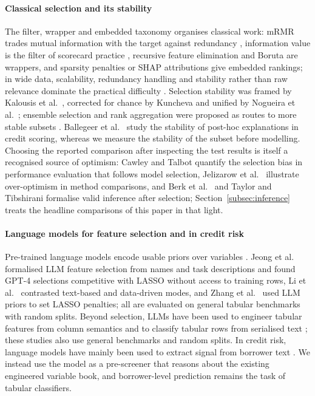 \documentclass[final,5p,twocolumn]{elsarticle}
\begin{document}
\paragraph{Classical selection and its stability}
The filter, wrapper and embedded taxonomy \cite{kohavi1997,guyon2003} organises classical work: mRMR trades mutual information with the target against redundancy \cite{peng2005}, information value is the filter of scorecard practice \cite{siddiqi2006}, recursive feature elimination \cite{guyon2002} and Boruta \cite{kursa2010,breiman2001} are wrappers, and sparsity penalties \cite{tibshirani1996} or SHAP attributions \cite{lundberg2017} give embedded rankings; in wide data, scalability, redundancy handling and stability rather than raw relevance dominate the practical difficulty \cite{boloncanedo2015}. Selection stability was framed by Kalousis et al.\ \cite{kalousis2007}, corrected for chance by Kuncheva \cite{kuncheva2007} and unified by Nogueira et al.\ \cite{nogueira2018}; ensemble selection and rank aggregation were proposed as routes to more stable subsets \cite{saeys2008,dwork2001}. Ballegeer et al.\ \cite{ballegeer2025} study the stability of post-hoc explanations in credit scoring, whereas we measure the stability of the subset before modelling. Choosing the reported comparison after inspecting the test results is itself a recognised source of optimism: Cawley and Talbot \cite{cawley2010} quantify the selection bias in performance evaluation that follows model selection, Jelizarow et al.\ \cite{jelizarow2010} illustrate over-optimism in method comparisons, and Berk et al.\ \cite{berk2013} and Taylor and Tibshirani \cite{taylor2015} formalise valid inference after selection; Section~\ref{subsec:inference} treats the headline comparisons of this paper in that light.

\paragraph{Language models for feature selection and in credit risk}
Pre-trained language models encode usable priors over variables \cite{choi2022}. Jeong et al.\ \cite{jeong2025} formalised LLM feature selection from names and task descriptions and found GPT-4 selections competitive with LASSO without access to training rows, Li et al.\ \cite{li2025sigkdd} contrasted text-based and data-driven modes, and Zhang et al.\ \cite{zhang2025llmlasso} used LLM priors to set LASSO penalties; all are evaluated on general tabular benchmarks with random splits. Beyond selection, LLMs have been used to engineer tabular features from column semantics \cite{hollmann2023caafe,han2024llmfe,nam2024octree} and to classify tabular rows from serialised text \cite{hegselmann2023tabllm}; these studies also use general benchmarks and random splits. In credit risk, language models have mainly been used to extract signal from borrower text \cite{sanzguerrero2025,xia2025}. We instead use the model as a pre-screener that reasons about the existing engineered variable book, and borrower-level prediction remains the task of tabular classifiers.
\end{document}
